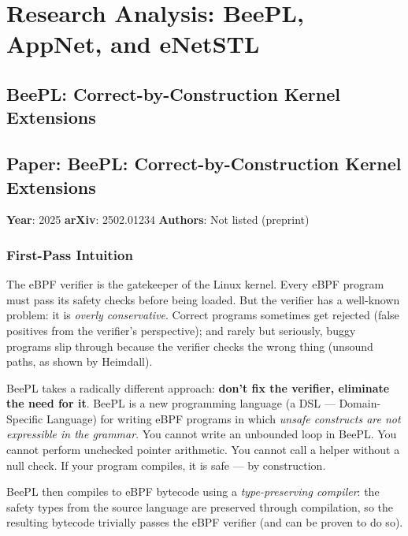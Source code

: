 
\section{Research Analysis: BeePL, AppNet, and eNetSTL}
\label{sec:beepl-appnet-enetSTL}

\subsection{BeePL: Correct-by-Construction Kernel Extensions}

\subsection*{Paper: BeePL: Correct-by-Construction Kernel Extensions}
\textbf{Year}: 2025 \quad \textbf{arXiv}: 2502.01234 \quad \textbf{Authors}: Not listed (preprint)

\subsubsection{First-Pass Intuition}

The eBPF verifier is the gatekeeper of the Linux kernel. Every eBPF program must pass its safety checks before being loaded. But the verifier has a well-known problem: it is \emph{overly conservative}. Correct programs sometimes get rejected (false positives from the verifier's perspective); and rarely but seriously, buggy programs slip through because the verifier checks the wrong thing (unsound paths, as shown by Heimdall).

BeePL takes a radically different approach: \textbf{don't fix the verifier, eliminate the need for it}. BeePL is a new programming language (a DSL --- Domain-Specific Language) for writing eBPF programs in which \emph{unsafe constructs are not expressible in the grammar}. You cannot write an unbounded loop in BeePL. You cannot perform unchecked pointer arithmetic. You cannot call a helper without a null check. If your program compiles, it is safe --- by construction.

BeePL then compiles to eBPF bytecode using a \emph{type-preserving compiler}: the safety types from the source language are preserved through compilation, so the resulting bytecode trivially passes the eBPF verifier (and can be proven to do so).

